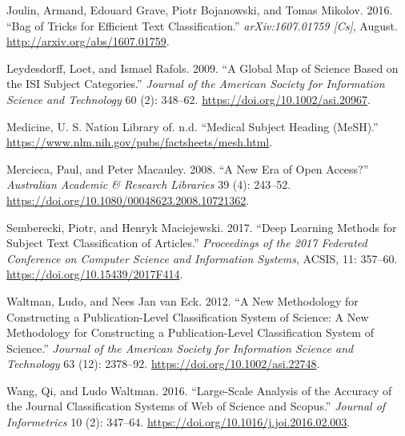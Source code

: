 \documentclass[
]{article}
\newlength{\cslhangindent}
\newenvironment{cslreferences}%
  {\setlength{\parindent}{0pt}%
  \everypar{\setlength{\hangindent}{\cslhangindent}}\ignorespaces}%
  {\par}
\begin{document}
\begin{cslreferences}
\leavevmode\hypertarget{ref-joulin_bag_2016}{}%
Joulin, Armand, Edouard Grave, Piotr Bojanowski, and Tomas Mikolov.
2016. ``Bag of Tricks for Efficient Text Classification.''
\emph{arXiv:1607.01759 {[}Cs{]}}, August.
\url{http://arxiv.org/abs/1607.01759}.

\leavevmode\hypertarget{ref-leydesdorff_global_2009}{}%
Leydesdorff, Loet, and Ismael Rafols. 2009. ``A Global Map of Science
Based on the ISI Subject Categories.'' \emph{Journal of the American
Society for Information Science and Technology} 60 (2): 348--62.
\url{https://doi.org/10.1002/asi.20967}.

\leavevmode\hypertarget{ref-us_nation_library_of_medicine_medical_nodate}{}%
Medicine, U. S. Nation Library of. n.d. ``Medical Subject Heading
(MeSH).'' \url{https://www.nlm.nih.gov/pubs/factsheets/mesh.html}.

\leavevmode\hypertarget{ref-mercieca_new_2008}{}%
Mercieca, Paul, and Peter Macauley. 2008. ``A New Era of Open Access?''
\emph{Australian Academic \& Research Libraries} 39 (4): 243--52.
\url{https://doi.org/10.1080/00048623.2008.10721362}.

\leavevmode\hypertarget{ref-semberecki_deep_2017}{}%
Semberecki, Piotr, and Henryk Maciejewski. 2017. ``Deep Learning Methods
for Subject Text Classification of Articles.'' \emph{Proceedings of the
2017 Federated Conference on Computer Science and Information Systems},
ACSIS, 11: 357--60. \url{https://doi.org/10.15439/2017F414}.

\leavevmode\hypertarget{ref-waltman_new_2012}{}%
Waltman, Ludo, and Nees Jan van Eck. 2012. ``A New Methodology for
Constructing a Publication-Level Classification System of Science: A New
Methodology for Constructing a Publication-Level Classification System
of Science.'' \emph{Journal of the American Society for Information
Science and Technology} 63 (12): 2378--92.
\url{https://doi.org/10.1002/asi.22748}.

\leavevmode\hypertarget{ref-wang_large-scale_2016}{}%
Wang, Qi, and Ludo Waltman. 2016. ``Large-Scale Analysis of the Accuracy
of the Journal Classification Systems of Web of Science and Scopus.''
\emph{Journal of Informetrics} 10 (2): 347--64.
\url{https://doi.org/10.1016/j.joi.2016.02.003}.
\end{cslreferences}
\end{document}
